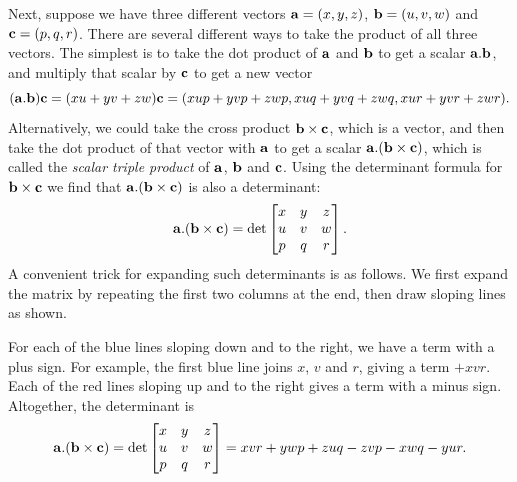 \documentclass[reqno]{amsart}
\theoremstyle{definition}
\begin{document}
Next, suppose we have three different vectors $\mathbf{a}=(x,y,z)$,
$\mathbf{b}=(u,v,w)$ and $\mathbf{c}=(p,q,r)$.  There are several different ways to
take the product of all three vectors.  The simplest is to take the
dot product of $\mathbf{a}$ and $\mathbf{b}$ to get a scalar $\mathbf{a}.\mathbf{b}$, and multiply
that scalar by $\mathbf{c}$ to get a new vector
\[ (\mathbf{a}.\mathbf{b})\mathbf{c} = 
    (xu+yv+zw)\mathbf{c} =
     (xup+yvp+zwp,xuq+yvq+zwq,xur+yvr+zwr).
\]
Alternatively, we could take the cross product $\mathbf{b}\times\mathbf{c}$, which is a
vector, and then take the dot product of that vector with $\mathbf{a}$ to get
a scalar $\mathbf{a}.(\mathbf{b}\times\mathbf{c})$, which is called the \emph{scalar triple
 product} of $\mathbf{a}$, $\mathbf{b}$ and $\mathbf{c}$.  Using the determinant formula
for $\mathbf{b}\times\mathbf{c}$ we find that $\mathbf{a}.(\mathbf{b}\times\mathbf{c})$ is also a determinant:
\[ \mathbf{a}.(\mathbf{b}\times\mathbf{c}) =
    \det\left[\begin{matrix} x&y&z \\ u&v&w \\ p&q&r \end{matrix}\right].
\]
A convenient trick for expanding such determinants is as follows.  We
first expand the matrix by repeating the first two columns at the end, 
then draw sloping lines as shown.
\begin{center}
\end{center}
For each of the blue lines sloping down and to the right, we have a
term with a plus sign.  For example, the first blue line joins $x$,
$v$ and $r$, giving a term $+xvr$.  Each of the red lines sloping up
and to the right gives a term with a minus sign.  Altogether, the
determinant is
\[ \mathbf{a}.(\mathbf{b}\times\mathbf{c}) =
    \det\left[\begin{matrix} x&y&z \\ u&v&w \\ p&q&r \end{matrix}\right] = 
      xvr+ywp+zuq - zvp-xwq-yur. 
\]
\end{document}
